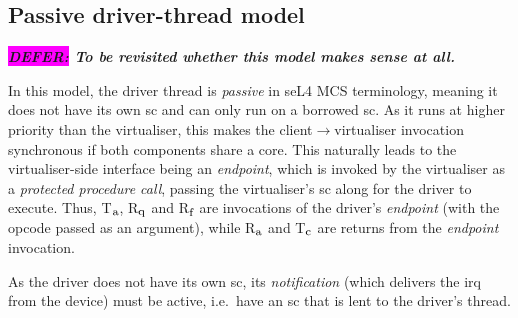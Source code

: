 \documentclass[a4paper,12pt]{report}
\newcommand{\DEFER}[1]{\textbf{\textsl{\colorbox{magenta}{DEFER:} #1}}}
\newcommand{\DEFER}[1]{\relax}
\newcommand{\Obj}[1]{\textsl{#1}}
\newcommand{\Ra}{R\(_{\mbox{\footnotesize a}}\)\xspace}
\newcommand{\Tc}{T\(_{\mbox{\footnotesize c}}\)\xspace}
\newcommand{\Ta}{T\(_{\mbox{\footnotesize a}}\)\xspace}
\newcommand{\Rq}{R\(_{\mbox{\footnotesize q}}\)\xspace}
\newcommand{\Rf}{R\(_{\mbox{\footnotesize f}}\)\xspace}
\begin{document}
\subsection{Passive driver-thread model}\label{s:dr-passive}

\DEFER{To be revisited whether this model makes sense at all.}

In this model, the driver thread is \emph{passive} in seL4 MCS
terminology, meaning it does not have its own \gls{sc} and can only run on
a borrowed \gls{sc}. As it runs at higher priority than the virtualiser, this makes
the client\(\rightarrow\)virtualiser invocation synchronous if both
components share a core. This
naturally leads to the virtualiser-side interface being an \Obj{endpoint}, which
is invoked by the virtualiser as a \emph{protected procedure call}, passing the
virtualiser's \gls{sc} along for the driver to execute. Thus, \Ta, \Rq and  \Rf
are invocations of the driver's \Obj{endpoint} (with the opcode passed as an
argument), while \Ra and \Tc are returns from the \Obj{endpoint} invocation.

As the driver does not have its own \gls{sc}, its \Obj{notification} (which
delivers the \gls{irq} from the device) must be active, i.e.\ have an \gls{sc}
that is lent to the driver's thread.
\end{document}
